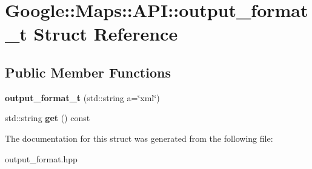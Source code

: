 \hypertarget{structGoogle_1_1Maps_1_1API_1_1output__format__t}{}\section{Google\+:\+:Maps\+:\+:A\+PI\+:\+:output\+\_\+format\+\_\+t Struct Reference}
\label{structGoogle_1_1Maps_1_1API_1_1output__format__t}
\subsection*{Public Member Functions}
\begin{DoxyCompactItemize}
\item 
\mbox{\label{structGoogle_1_1Maps_1_1API_1_1output__format__t_aee4b4f5757c465e4fdb7398a286daa57}} 
{\bfseries output\+\_\+format\+\_\+t} (std\+::string a=\char`\"{}xml\char`\"{})
\item 
\mbox{\label{structGoogle_1_1Maps_1_1API_1_1output__format__t_a1cb355bdc5f1900bfd3ed472878eab4e}} 
std\+::string {\bfseries get} () const
\end{DoxyCompactItemize}


The documentation for this struct was generated from the following file\+:\begin{DoxyCompactItemize}
\item 
output\+\_\+format.\+hpp\end{DoxyCompactItemize}
